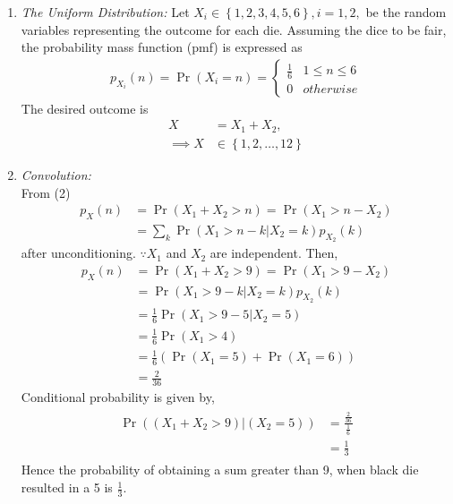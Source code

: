 \documentclass[10pt,twocolumn]{article}
\providecommand{\pr}[1]{\ensuremath{\Pr\left(#1\right)}}
\providecommand{\brak}[1]{\ensuremath{\left(#1\right)}}
\providecommand{\cbrak}[1]{\ensuremath{\left\{#1\right\}}}
\begin{document}
\begin{enumerate}
\item  {\em The Uniform Distribution: }Let $X_i \in \cbrak{1,2,3,4,5,6}, i = 1,2,$ be the random variables representing the outcome for each die.  Assuming the dice to be fair, the probability mass function (pmf) is expressed as 
\begin{align}
p_{X_i}(n) = \pr{X_i = n} = 
\begin{cases}
\frac{1}{6} & 1 \le n \le 6
\\
0 & otherwise
\end{cases}
\end{align}
The desired outcome is
\begin{align}
X &= X_1 + X_2, \\
\implies X &\in \cbrak{1,2,\dots,12}
\end{align}

\item {\em Convolution: } \\
From (2)
\begin{align}
p_X(n) &= \pr{X_1 + X_2 > n} = \pr{X_1  > n -X_2} \\
&= \sum_{k}^{}\pr{X_1  > n -k | X_2 = k}p_{X_2}(k)
\end{align}
after unconditioning. $\because X_1$ and $X_2$ are independent.
Then,
\begin{align}
p_X(n) &= \pr{X_1 + X_2 > 9} = \pr{X_1  > 9 -X_2} \\
&= \pr{X_1  > 9 -k | X_2 = k}p_{X_2}(k) \\
&= \frac{1}{6} \pr{X_1  > 9 -5 | X_2 = 5} \\
&= \frac{1}{6} \pr{X_1 > 4} \\
&= \frac{1}{6} (\pr{X_1 = 5} + \pr{X_1 = 6}) \\
&= \frac{2}{36}
\end{align}
Conditional probability is given by,
\begin{align}
\begin{split}
\Pr{\brak{\brak{X_1 + X_2 > 9}|\brak{X_2=5}}} &= 
\frac{\frac{2}{36}}{\frac{1}{6}}\\
&=\frac{1}{3}
\end{split}
\end{align}  
Hence the probability of obtaining a sum greater than 9, when black die resulted in a 5 is $\frac{1}{3}$. 


\end{enumerate}
\end{document}
